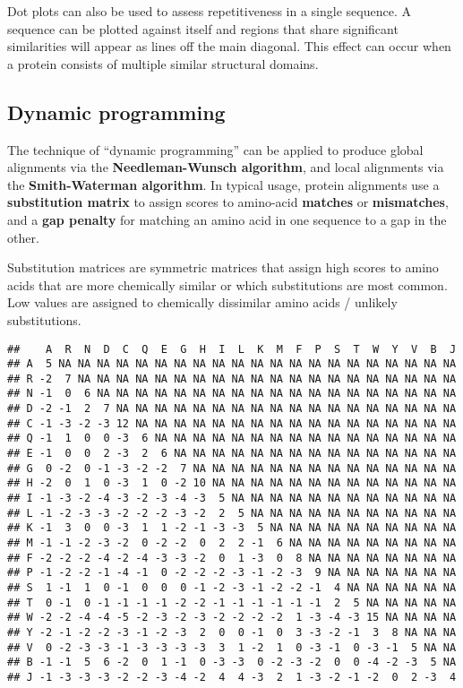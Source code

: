 \documentclass[
]{book}
\begin{document}
Dot plots can also be used to assess repetitiveness in a single sequence. A sequence can be plotted against itself and regions that share significant similarities will appear as lines off the main diagonal. This effect can occur when a protein consists of multiple similar structural domains.

\hypertarget{dynamic-programming}{%
\subsection{Dynamic programming}\label{dynamic-programming}}

The technique of ``dynamic programming'' can be applied to produce global alignments via the \textbf{Needleman-Wunsch algorithm}, and local alignments via the \textbf{Smith-Waterman algorithm}. In typical usage, protein alignments use a \textbf{substitution matrix} to assign scores to amino-acid \textbf{matches} or \textbf{mismatches}, and a \textbf{gap penalty} for matching an amino acid in one sequence to a gap in the other.

Substitution matrices are symmetric matrices that assign high scores to amino acids that are more chemically similar or which substitutions are most common. Low values are assigned to chemically dissimilar amino acids / unlikely substitutions.

\begin{verbatim}
##    A  R  N  D  C  Q  E  G  H  I  L  K  M  F  P  S  T  W  Y  V  B  J
## A  5 NA NA NA NA NA NA NA NA NA NA NA NA NA NA NA NA NA NA NA NA NA
## R -2  7 NA NA NA NA NA NA NA NA NA NA NA NA NA NA NA NA NA NA NA NA
## N -1  0  6 NA NA NA NA NA NA NA NA NA NA NA NA NA NA NA NA NA NA NA
## D -2 -1  2  7 NA NA NA NA NA NA NA NA NA NA NA NA NA NA NA NA NA NA
## C -1 -3 -2 -3 12 NA NA NA NA NA NA NA NA NA NA NA NA NA NA NA NA NA
## Q -1  1  0  0 -3  6 NA NA NA NA NA NA NA NA NA NA NA NA NA NA NA NA
## E -1  0  0  2 -3  2  6 NA NA NA NA NA NA NA NA NA NA NA NA NA NA NA
## G  0 -2  0 -1 -3 -2 -2  7 NA NA NA NA NA NA NA NA NA NA NA NA NA NA
## H -2  0  1  0 -3  1  0 -2 10 NA NA NA NA NA NA NA NA NA NA NA NA NA
## I -1 -3 -2 -4 -3 -2 -3 -4 -3  5 NA NA NA NA NA NA NA NA NA NA NA NA
## L -1 -2 -3 -3 -2 -2 -2 -3 -2  2  5 NA NA NA NA NA NA NA NA NA NA NA
## K -1  3  0  0 -3  1  1 -2 -1 -3 -3  5 NA NA NA NA NA NA NA NA NA NA
## M -1 -1 -2 -3 -2  0 -2 -2  0  2  2 -1  6 NA NA NA NA NA NA NA NA NA
## F -2 -2 -2 -4 -2 -4 -3 -3 -2  0  1 -3  0  8 NA NA NA NA NA NA NA NA
## P -1 -2 -2 -1 -4 -1  0 -2 -2 -2 -3 -1 -2 -3  9 NA NA NA NA NA NA NA
## S  1 -1  1  0 -1  0  0  0 -1 -2 -3 -1 -2 -2 -1  4 NA NA NA NA NA NA
## T  0 -1  0 -1 -1 -1 -1 -2 -2 -1 -1 -1 -1 -1 -1  2  5 NA NA NA NA NA
## W -2 -2 -4 -4 -5 -2 -3 -2 -3 -2 -2 -2 -2  1 -3 -4 -3 15 NA NA NA NA
## Y -2 -1 -2 -2 -3 -1 -2 -3  2  0  0 -1  0  3 -3 -2 -1  3  8 NA NA NA
## V  0 -2 -3 -3 -1 -3 -3 -3 -3  3  1 -2  1  0 -3 -1  0 -3 -1  5 NA NA
## B -1 -1  5  6 -2  0  1 -1  0 -3 -3  0 -2 -3 -2  0  0 -4 -2 -3  5 NA
## J -1 -3 -3 -3 -2 -2 -3 -4 -2  4  4 -3  2  1 -3 -2 -1 -2  0  2 -3  4
\end{verbatim}
\end{document}
